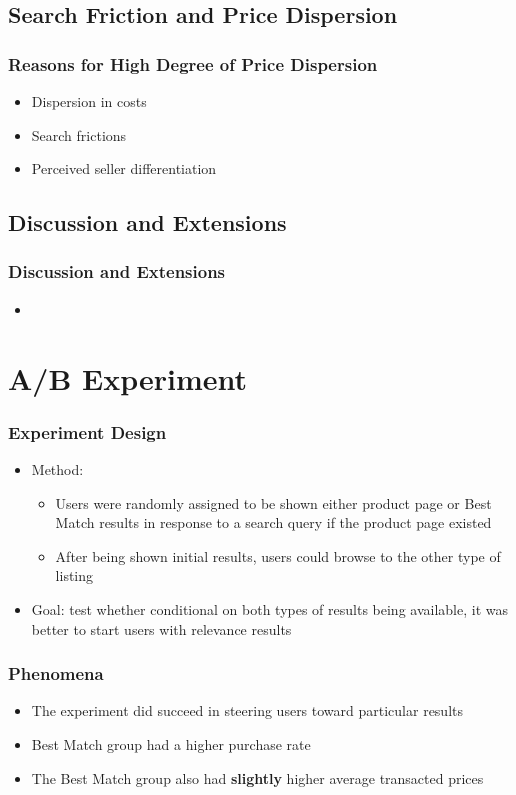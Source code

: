 \documentclass{beamer}
\begin{document}
\subsection{Search Friction and Price Dispersion}
\begin{frame}
\frametitle{Reasons for High Degree of Price Dispersion}
\begin{itemize}
\item Dispersion in costs
\item Search frictions
\item Perceived seller differentiation
\end{itemize}
\end{frame}


\subsection{Discussion and Extensions}
\begin{frame}
\frametitle{Discussion and Extensions}
\begin{itemize}
\item 
\end{itemize}
\end{frame}

\section{A/B Experiment}
\begin{frame}
\frametitle{Experiment Design}
\begin{itemize}
\item Method:
\begin{itemize} 
\item Users were randomly assigned to be shown either product page or Best Match results in response to a search query if the product page existed
\item After being shown initial results, users could browse to the other type of listing
\end{itemize}
\item Goal: test whether conditional on both types of results being available, it was better to start users with relevance results
\end{itemize}
\end{frame}

\begin{frame}
\frametitle{Phenomena}
\begin{itemize}
\item The experiment did succeed in steering users toward particular results
\item Best Match group had a higher purchase rate
\item The Best Match group also had \textbf{slightly} higher average transacted prices
\end{itemize}
\end{frame}
\end{document}
